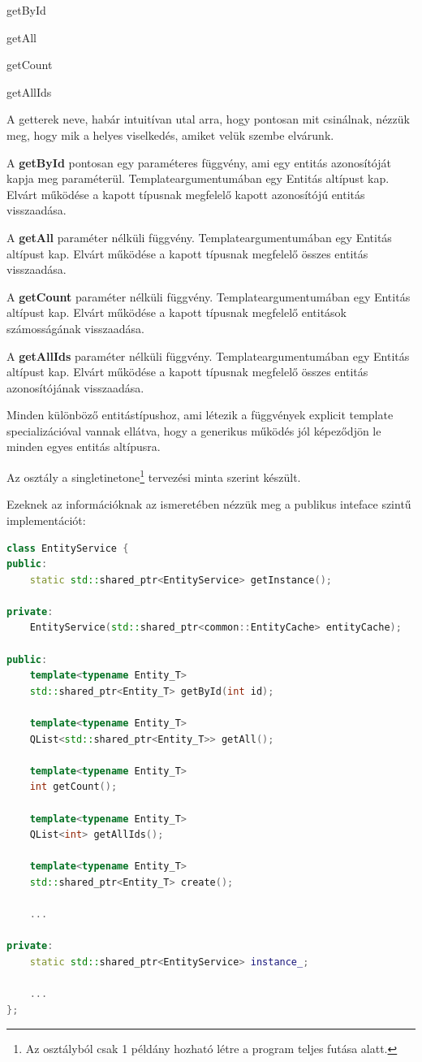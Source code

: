 \begin{compactitem}
	\item getById
	\item getAll
	\item getCount
    \item getAllIds
\end{compactitem}

A getterek neve, habár intuitívan utal arra, hogy pontosan mit csinálnak, nézzük meg, hogy mik a helyes viselkedés, amiket velük szembe elvárunk.

A \textbf{getById} pontosan egy paraméteres függvény, ami egy entitás azonosítóját kapja meg paraméterül. Templateargumentumában egy Entitás altípust kap. Elvárt működése a kapott típusnak megfelelő kapott azonosítójú entitás visszaadása.

A \textbf{getAll} paraméter nélküli függvény. Templateargumentumában egy Entitás altípust kap. Elvárt működése a kapott típusnak megfelelő összes entitás visszaadása.

A \textbf{getCount} paraméter nélküli függvény. Templateargumentumában egy Entitás altípust kap. Elvárt működése a kapott típusnak megfelelő entitások számosságának visszaadása.

A \textbf{getAllIds} paraméter nélküli függvény. Templateargumentumában egy Entitás altípust kap. Elvárt működése a kapott típusnak megfelelő összes entitás azonosítójának visszaadása.

Minden különböző entitástípushoz, ami létezik a függvények explicit template specializációval vannak ellátva, hogy a generikus működés jól képeződjön le minden egyes entitás altípusra.

Az osztály a singletinetone\footnote{Az osztályból csak 1 példány hozható létre a program teljes futása alatt.} tervezési minta szerint készült.

Ezeknek az információknak az ismeretében nézzük meg a publikus inteface szintű implementációt:

\begin{lstlisting}[language={C++}]
class EntityService {
public:
    static std::shared_ptr<EntityService> getInstance();

private:
    EntityService(std::shared_ptr<common::EntityCache> entityCache);

public:
    template<typename Entity_T>
    std::shared_ptr<Entity_T> getById(int id);

    template<typename Entity_T>
    QList<std::shared_ptr<Entity_T>> getAll();

    template<typename Entity_T>
    int getCount();

    template<typename Entity_T>
    QList<int> getAllIds();

    template<typename Entity_T>
    std::shared_ptr<Entity_T> create();

    ...
    
private:
    static std::shared_ptr<EntityService> instance_;

    ...
};
\end{lstlisting}

